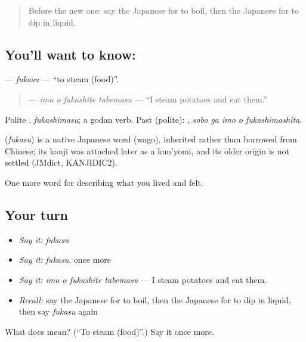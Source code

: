 \begin{quote}
Before the new one: say the Japanese for to boil, then the Japanese for to dip in liquid.
\end{quote}

\subsection*{You'll want to know: }
\textbf{} — \emph{fukasu} — \textquotedblleft{}to steam (food)\textquotedblright{}.

\begin{quote}
\textbf{  } — \emph{imo o fukashite tabemasu} — \textquotedblleft{}I steam potatoes and eat them.\textquotedblright{}
\end{quote}

Polite \textbf{}, \emph{fukashimasu}; a godan verb. Past (polite): \textbf{  }, \emph{sobo ga imo o fukashimashita}.

\begin{cousinweb}
\textbf{} (\emph{fukasu}) is a native Japanese word (wago), inherited rather than borrowed from Chinese; its kanji was attached later as a kun'yomi, and its older origin is not settled (JMdict, KANJIDIC2).
\end{cousinweb}

\begin{grammarlens}[title={What you've built}]
One more word for describing what you lived and felt.
\end{grammarlens}

\subsection*{Your turn}
\begin{itemize}
\raggedright
  \item \emph{Say it:} \emph{fukasu}
  \item \emph{Say it:} \emph{fukasu}, once more
  \item \emph{Say it:} \emph{imo o fukashite tabemasu} — I steam potatoes and eat them.
  \item \emph{Recall:} say the Japanese for to boil, then the Japanese for to dip in liquid, then say \emph{fukasu} again
\end{itemize}

\begin{tcolorbox}[breakable,colback=teal!4,colframe=teal!35!black,title={Before you move on}]
What does  mean? (\textquotedblleft{}To steam (food)\textquotedblright{}.) Say it once more.
\end{tcolorbox}
